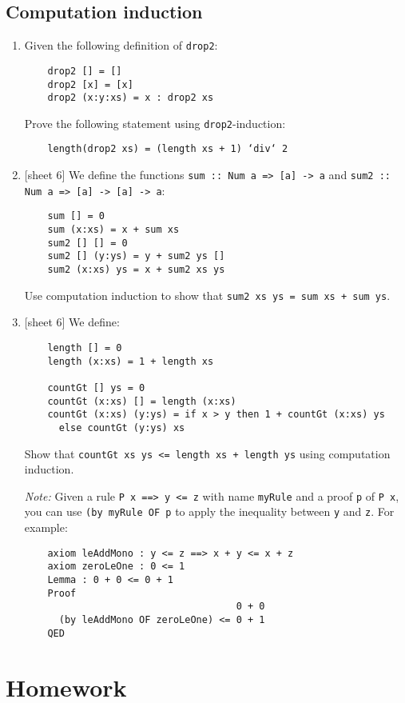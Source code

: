 \documentclass{article}
\def\code#1{\texttt{#1}}
\begin{document}
\subsection{Computation induction}
\begin{enumerate}
    \item Given the following definition of \code{drop2}:
        \begin{verbatim}
    drop2 [] = []
    drop2 [x] = [x]
    drop2 (x:y:xs) = x : drop2 xs
        \end{verbatim}
        Prove the following statement using \code{drop2}-induction:
        \begin{verbatim}
    length(drop2 xs) = (length xs + 1) ‘div‘ 2
        \end{verbatim}

    \item {[sheet 6]} We define the functions \code{sum :: Num a => [a] -> a} and \code{sum2 :: Num a => [a] -> [a] -> a}:
        \begin{verbatim}
    sum [] = 0
    sum (x:xs) = x + sum xs
    sum2 [] [] = 0
    sum2 [] (y:ys) = y + sum2 ys []
    sum2 (x:xs) ys = x + sum2 xs ys
        \end{verbatim}
        Use computation induction to show that \code{sum2 xs ys = sum xs + sum ys}.

    \item {[sheet 6]} We define:
        \begin{verbatim}
    length [] = 0
    length (x:xs) = 1 + length xs

    countGt [] ys = 0
    countGt (x:xs) [] = length (x:xs)
    countGt (x:xs) (y:ys) = if x > y then 1 + countGt (x:xs) ys
      else countGt (y:ys) xs
        \end{verbatim}
        Show that \code{countGt xs ys <= length xs + length ys} using computation induction. \par
        \textit{Note:} Given a rule \code{P x ==> y <= z} with name \code{myRule} and a proof \code{p} of \code{P x}, you can use \code{(by myRule OF p} to apply the inequality between \code{y} and \code{z}. For example:
        \begin{verbatim}
    axiom leAddMono : y <= z ==> x + y <= x + z
    axiom zeroLeOne : 0 <= 1
    Lemma : 0 + 0 <= 0 + 1
    Proof
                                     0 + 0
      (by leAddMono OF zeroLeOne) <= 0 + 1
    QED
        \end{verbatim}
\end{enumerate}

\section{Homework}

\printbibliography
\end{document}
